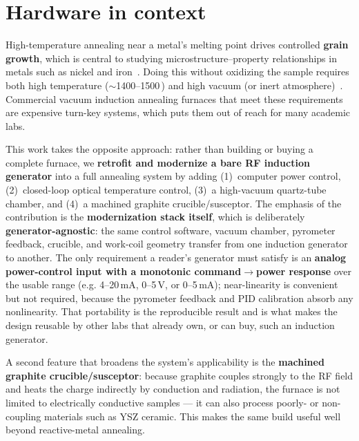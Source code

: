 \documentclass[5p,times]{elsarticle}
\begin{document}
\section{Hardware in context}

High-temperature annealing near a metal's melting point drives controlled
\textbf{grain growth}, which is central to studying microstructure--property
relationships in metals such as nickel and iron~\cite{liu2021studyofgrain,mohrbacher2026applicationofmicroalloying,alogab2007theinfluenceof}. Doing this without oxidizing the
sample requires both high temperature ($\sim$1400--1500\,\celsius) and high vacuum
(or inert atmosphere)~\cite{zhornyak1982reductionanddecarburization,muramatsu2005gascontaminationdue}. Commercial vacuum induction annealing furnaces that meet
these requirements are expensive turn-key systems, which puts them out of reach for
many academic labs.

This work takes the opposite approach: rather than building or buying a complete
furnace, we \textbf{retrofit and modernize a bare RF induction generator} into a
full annealing system by adding (1)~computer power control, (2)~closed-loop optical
temperature control, (3)~a high-vacuum quartz-tube chamber, and (4)~a machined
graphite crucible/susceptor. The emphasis of the contribution is the
\textbf{modernization stack itself}, which is deliberately
\textbf{generator-agnostic}: the same control software, vacuum chamber, pyrometer
feedback, crucible, and work-coil geometry transfer from one induction generator to
another. The only requirement a reader's generator must satisfy is an \textbf{analog
power-control input with a monotonic command$\rightarrow$power response} over the
usable range (e.g. 4--20\,mA, 0--5\,V, or 0--5\,mA); near-linearity is convenient but
not required, because the pyrometer feedback and PID calibration absorb any
nonlinearity. That portability is the reproducible result and is what makes the
design reusable by other labs that already own, or can buy, such an induction
generator.

A second feature that broadens the system's applicability is the \textbf{machined
graphite crucible/susceptor}: because graphite couples strongly to the RF field and
heats the charge indirectly by conduction and radiation, the furnace is not limited
to electrically conductive samples --- it can also process poorly- or non-coupling
materials such as YSZ ceramic. This makes the same build useful well beyond
reactive-metal annealing.
\end{document}
